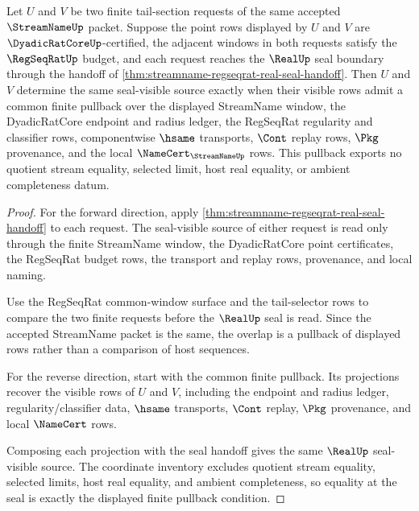 \begin{theorem}
\label{thm:streamname-regseqrat-real-tail-section-pullback}
Let $U$ and $V$ be two finite tail-section requests of the same accepted $\StreamNameUp$ packet. Suppose the point rows displayed by $U$ and $V$ are $\DyadicRatCoreUp$-certified, the adjacent windows in both requests satisfy the $\RegSeqRatUp$ budget, and each request reaches the $\RealUp$ seal boundary through the handoff of \autoref{thm:streamname-regseqrat-real-seal-handoff}. Then $U$ and $V$ determine the same seal-visible source exactly when their visible rows admit a common finite pullback over the displayed StreamName window, the DyadicRatCore endpoint and radius ledger, the RegSeqRat regularity and classifier rows, componentwise $\hsame$ transports, $\Cont$ replay rows, $\Pkg$ provenance, and the local $\NameCert_{\StreamNameUp}$ rows. This pullback exports no quotient stream equality, selected limit, host real equality, or ambient completeness datum.
\end{theorem}
\begin{proof}
For the forward direction, apply \autoref{thm:streamname-regseqrat-real-seal-handoff} to each request. The seal-visible source of either request is read only through the finite StreamName window, the DyadicRatCore point certificates, the RegSeqRat budget rows, the transport and replay rows, provenance, and local naming.

Use the RegSeqRat common-window surface and the tail-selector rows to compare the two finite requests before the $\RealUp$ seal is read. Since the accepted StreamName packet is the same, the overlap is a pullback of displayed rows rather than a comparison of host sequences.

For the reverse direction, start with the common finite pullback. Its projections recover the visible rows of $U$ and $V$, including the endpoint and radius ledger, regularity/classifier data, $\hsame$ transports, $\Cont$ replay, $\Pkg$ provenance, and local $\NameCert$ rows.

Composing each projection with the seal handoff gives the same $\RealUp$ seal-visible source. The coordinate inventory excludes quotient stream equality, selected limits, host real equality, and ambient completeness, so equality at the seal is exactly the displayed finite pullback condition.
\end{proof}


